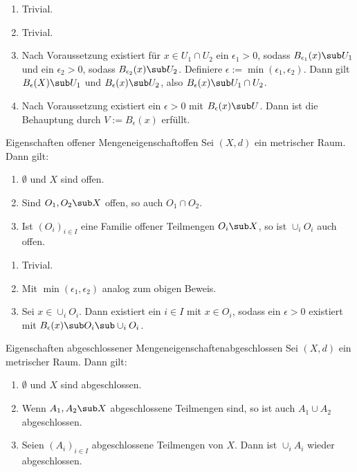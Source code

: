 \begin{beweis}
\begin{enumerate}
\item Trivial.
\item Trivial.
\item Nach Voraussetzung existiert für $x \in U_1 \cap U_2$ ein $\epsilon_1 > 0$, sodass $B_{\epsilon_1} (x) \sub U_1$ und ein $\epsilon_2 > 0$, sodass $B_{\epsilon_2} (x) \sub U_2$. Definiere $\epsilon := \min (\epsilon_1, \epsilon_2)$. Dann gilt $B_\epsilon (X) \sub U_1$ und $B_\epsilon (x) \sub U_2$, also $B_\epsilon (x) \sub U_1 \cap U_2$.
\item Nach Voraussetzung existiert ein $\epsilon > 0$ mit $B_\epsilon (x) \sub U$. Dann ist die Behauptung durch $V:=B_\epsilon(x)$ erfüllt.
\end{enumerate}
\end{beweis}
\begin{satz}{Eigenschaften offener Mengen}{eigenschaftoffen}
Sei $(X,d)$ ein metrischer Raum. Dann gilt:
\begin{enumerate}
\item $\emptyset$ und $X$ sind offen.
\item Sind $O_1, O_2 \sub X$ offen, so auch $O_1 \cap O_2$.
\item Ist $(O_i)_{i \in I}$ eine Familie offener Teilmengen $O_i \sub X$, so ist $\cup_i O_i$ auch offen.
\end{enumerate}
\end{satz}
\begin{beweis}
\begin{enumerate}
\item Trivial.
\item Mit $\min (\epsilon_1, \epsilon_2)$ analog zum obigen Beweis.
\item Sei $x \in \cup_i O_i$. Dann existiert ein $i \in I$ mit $x \in O_i$, sodass ein $\epsilon > 0$ existiert mit $B_\epsilon(x) \sub O_i \sub \cup_i O_i$.
\end{enumerate}
\end{beweis}
\begin{satz}{Eigenschaften abgeschlossener Mengen}{eigenschaftenabgeschlossen}
Sei $(X,d)$ ein metrischer Raum. Dann gilt:
\begin{enumerate}
\item $\emptyset$ und $X$ sind abgeschlossen.
\item Wenn $A_1, A_2 \sub X$ abgeschlossene Teilmengen sind, so ist auch $A_1 \cup A_2$ abgeschlossen.
\item Seien $(A_i)_{i \in I}$ abgeschlossene Teilmengen von $X$. Dann ist $\cup_i A_i$ wieder abgeschlossen.
\end{enumerate}
\end{satz}
